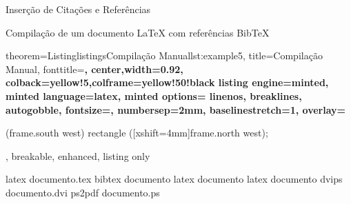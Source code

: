 \documentclass[10pt]{beamer}
\begin{document}
\begin{frame}[fragile]{Inserção de Citações e Referências}
    \begin{block}{Compilação de um documento \LaTeX{} com referências Bib\TeX{}}
        \vspace{1em}
    \begin{tcblisting}{
        theorem={Listing}{listings}{Compilação Manual}{lst:example5},
        title=Compilação Manual,
        fonttitle=\small\bfseries,
        center,width=0.92\paperwidth,
        colback=yellow!5,colframe=yellow!50!black
        listing engine=minted,
        minted language=latex,
        minted options={%
            linenos,
            breaklines,
            autogobble,
            fontsize=\small,
            numbersep=2mm,
            baselinestretch=1},
        overlay={%
        \begin{tcbclipinterior}
            \fill[gray!25] (frame.south west) rectangle ([xshift=4mm]frame.north west);
        \end{tcbclipinterior}},
        breakable, enhanced, listing only}
            latex documento.tex
            bibtex documento
            latex documento
            latex documento
            dvips documento.dvi
            ps2pdf documento.ps
    \end{tcblisting}        
    \end{block}
\end{frame}
\end{document}
